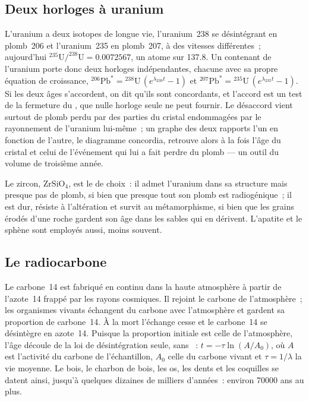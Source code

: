 \subsection*{Deux horloges à uranium}

L'uranium a deux isotopes de longue vie, l'uranium~238 se désintégrant en plomb~206
et l'uranium~235 en plomb~207, à des vitesses différentes~; aujourd'hui
$^{235}\mathrm{U}/^{238}\mathrm{U} = 0.0072567$, un atome sur 137.8. Un 
contenant de l'uranium porte donc deux horloges indépendantes, chacune avec sa propre
équation de croissance, ${}^{206}\mathrm{Pb}^* = {}^{238}\mathrm{U}\,(e^{\lambda_{238} t} - 1)$
et ${}^{207}\mathrm{Pb}^* = {}^{235}\mathrm{U}\,(e^{\lambda_{235} t} - 1)$. Si les
deux âges s'accordent, on dit qu'ils sont concordants, et l'accord est un test
de la fermeture du , que nulle horloge seule ne peut fournir. Le désaccord
vient surtout de plomb perdu par des parties du cristal endommagées par le rayonnement
de l'uranium lui-même~; un graphe des deux rapports l'un en fonction de l'autre, le
diagramme concordia, retrouve alors à la fois l'âge du cristal et celui de
l'événement qui lui a fait perdre du plomb --- un outil du volume de troisième année.

Le zircon, $\mathrm{ZrSiO_4}$, est le  de choix~: il admet l'uranium dans sa
structure mais presque pas de plomb, si bien que presque tout son plomb est radiogénique~; il est
dur, résiste à l'altération et survit au métamorphisme, si bien que les grains érodés
d'une roche gardent son âge dans les sables qui en dérivent. L'apatite et le sphène sont employés
aussi, moins souvent.

\subsection*{Le radiocarbone}

Le carbone~14 est fabriqué en continu dans la haute atmosphère à partir de l'azote~14 frappé
par les rayons cosmiques. Il rejoint le carbone de l'atmosphère~; les organismes vivants
échangent du carbone avec l'atmosphère et gardent sa proportion de carbone~14. À
la mort l'échange cesse et le carbone~14 se désintègre en azote~14. Puisque la
proportion initiale est celle de l'atmosphère, l'âge découle de la loi de désintégration
seule, sans ~: $t = -\tau \ln(A/A_0)$, où $A$ est
l'activité du carbone de l'échantillon, $A_0$ celle du carbone vivant et $\tau =
1/\lambda$ la vie moyenne. Le bois, le charbon de bois, les os, les dents et les coquilles se datent ainsi,
jusqu'à quelques dizaines de milliers d'années~: environ \num{70000} ans au plus.

